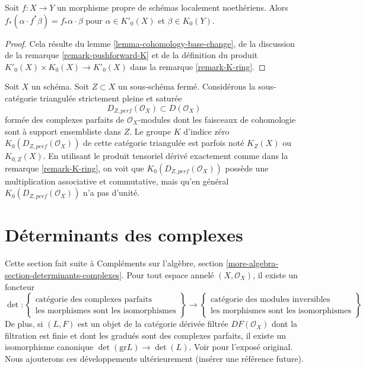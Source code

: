 \begin{lemma}
\label{lemma-projection-formula}
Soit $f : X \to Y$ un morphisme propre de schémas localement noethériens.
Alors $f_*(\alpha \cdot f^*\beta) = f_*\alpha \cdot \beta$
pour $\alpha \in K'_0(X)$ et $\beta \in K_0(Y)$.
\end{lemma}

\begin{proof}
Cela résulte du lemme \ref{lemma-cohomology-base-change}, de la discussion de la
remarque \ref{remark-pushforward-K} et de la définition du produit
$K'_0(X) \times K_0(X) \to K'_0(X)$ dans la remarque \ref{remark-K-ring}.
\end{proof}

\begin{remark}
\label{remark-perf-Z}
Soit $X$ un schéma. Soit $Z \subset X$ un sous-schéma fermé. Considérons la
sous-catégorie triangulée strictement pleine et saturée
$$
D_{Z, perf}(\mathcal{O}_X) \subset D(\mathcal{O}_X)
$$
formée des complexes parfaits de $\mathcal{O}_X$-modules
dont les faisceaux de cohomologie sont à support ensembliste dans $Z$.
Le groupe $K$ d'indice zéro $K_0(D_{Z, perf}(\mathcal{O}_X))$
de cette catégorie triangulée est parfois noté
$K_Z(X)$ ou $K_{0, Z}(X)$. En utilisant le produit tensoriel dérivé exactement
comme dans la remarque \ref{remark-K-ring}, on voit que $K_0(D_{Z, perf}(\mathcal{O}_X))$
possède une multiplication associative et commutative,
mais qu'en général $K_0(D_{Z, perf}(\mathcal{O}_X))$ n'a pas d'unité.
\end{remark}










\section{Déterminants des complexes}
\label{section-det-two-terms}

\noindent
Cette section fait suite à
Compléments sur l'algèbre, section \ref{more-algebra-section-determinants-complexes}.
Pour tout espace annelé $(X, \mathcal{O}_X)$, il existe un foncteur
$$
\det :
\left\{
\begin{matrix}
\text{catégorie des complexes parfaits} \\
\text{les morphismes sont les isomorphismes}
\end{matrix}
\right\}
\longrightarrow
\left\{
\begin{matrix}
\text{catégorie des modules inversibles} \\
\text{les morphismes sont les isomorphismes}
\end{matrix}
\right\}
$$
De plus, si $(L, F)$ est un objet de la catégorie dérivée filtrée
$DF(\mathcal{O}_X)$ dont la filtration est finie et dont les gradués
sont des complexes parfaits, il existe un isomorphisme canonique
$\det(\text{gr}L) \to \det(L)$. Voir \cite{determinant} pour l'exposé
original. Nous ajouterons ces développements ultérieurement (insérer une référence future).

